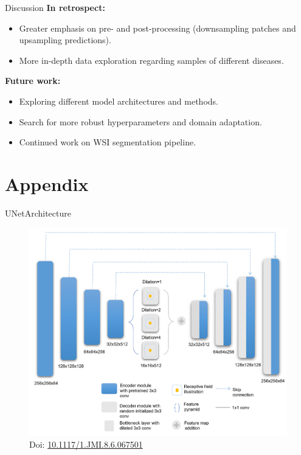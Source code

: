\documentclass{beamer}
\begin{document}
\begin{frame}{Discussion}
    \textbf{In retrospect:}
    \begin{itemize}
        \item Greater emphasis on pre- and post-processing (downsampling patches and upsampling predictions).
        \item More in-depth data exploration regarding samples of different diseases.
    \end{itemize}

    \vspace{0.5cm}

    \textbf{Future work:}
    \begin{itemize}
        \item Exploring different model architectures and methods.
        \item Search for more robust hyperparameters and domain adaptation.
        \item Continued work on WSI segmentation pipeline.
    \end{itemize}
\end{frame}

\appendix

\section{Appendix}

\begin{frame}{UNetArchitecture}
    \begin{figure}
        \centering
        \includegraphics[height=0.7\textheight]{Images/UNetArchitecture.png}
        \caption{Doi: \href{https://doi.org/10.1117/1.JMI.8.6.067501}{10.1117/1.JMI.8.6.067501}}
    \end{figure}
\end{frame}
\end{document}

